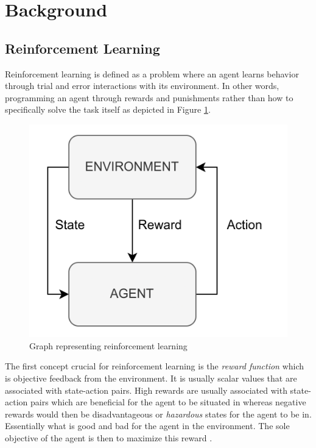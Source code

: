 \section{Background}

\subsection{Reinforcement Learning}

Reinforcement learning is defined as a problem where an agent learns behavior through trial and error interactions with its environment. 
In other words, programming an agent through rewards and punishments rather than how to specifically solve the task itself \cite{kaelbling1996reinforcement} as depicted in Figure \ref{figRL}.
\begin{figure}[H]
    \centering
    \includegraphics [scale = 0.2]{Images/RL_graph.png}
    \caption{Graph representing reinforcement learning}
    \label{figRL}
\end{figure}
The first concept crucial for reinforcement learning is the \textit{reward function} which is objective feedback from the environment. 
It is usually scalar values that are associated with state-action pairs. 
High rewards are usually associated with state-action pairs which are beneficial for the agent to be situated in whereas negative rewards would then be disadvantageous or \textit{hazardous} states for the agent to be in. 
Essentially what is good and bad for the agent in the environment. The sole objective of the agent is then to maximize this reward \cite{sutton1999reinforcement}.

